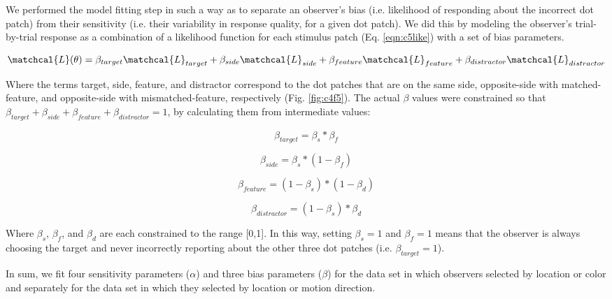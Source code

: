 We performed the model fitting step in such a way as to separate an observer's bias (i.e. likelihood of responding about the incorrect dot patch) from their sensitivity (i.e. their variability in response quality, for a given dot patch). We did this by modeling the observer's trial-by-trial response as a combination of a likelihood function for each stimulus patch (Eq. \ref{eqn:c5like}) with a set of bias parameters.

\begin{equation}
    \matchcal{L}(\theta) = \beta_{target}\matchcal{L}_{target} + \beta_{side}\matchcal{L}_{side} +\beta_{feature}\matchcal{L}_{feature} +\beta_{distractor}\matchcal{L}_{distractor}
\end{equation}

Where the terms target, side, feature, and distractor correspond to the dot patches that are on the same side, opposite-side with matched-feature, and opposite-side with mismatched-feature, respectively (Fig. \ref{fig:c4f5}). The actual $\beta$ values were constrained so that $\beta_{target}+\beta_{side}+\beta_{feature}+\beta_{distractor}=1$, by calculating them from intermediate values:

\begin{equation}
    \beta_{target} = \beta_{s} * \beta_{f}
\end{equation}

\begin{equation}
    \beta_{side} = \beta_{s} * (1-\beta_{f})
\end{equation}

\begin{equation}
    \beta_{feature} = (1-\beta_{s}) * (1-\beta_{d})
\end{equation}

\begin{equation}
    \beta_{distractor} = (1-\beta_{s}) * \beta_{d}
\end{equation}

Where $\beta_s$, $\beta_f$, and $\beta_d$ are each constrained to the range [0,1]. In this way, setting $\beta_s=1$ and $\beta_f=1$ means that the observer is always choosing the target and never incorrectly reporting about the other three dot patches (i.e. $\beta_{target}=1$).

In sum, we fit four sensitivity parameters ($\alpha$) and three bias parameters ($\beta$) for the data set in which observers selected by location or color and separately for the data set in which they selected by location or motion direction.

